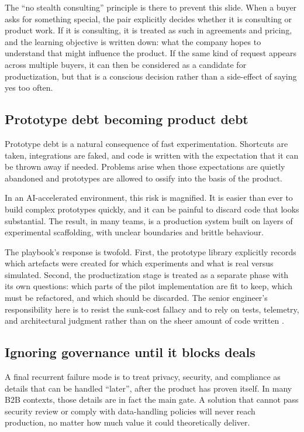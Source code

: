 \documentclass[10pt, a4paper, twocolumn]{article} %
\begin{document}
The “no stealth consulting” principle is there to prevent this slide. When a buyer asks for something special, the pair explicitly decides whether it is consulting or product work. If it is consulting, it is treated as such in agreements and pricing, and the learning objective is written down: what the company hopes to understand that might influence the product. If the same kind of request appears across multiple buyers, it can then be considered as a candidate for productization, but that is a conscious decision rather than a side-effect of saying yes too often.

\newpage
\subsection{Prototype debt becoming product debt}

Prototype debt is a natural consequence of fast experimentation. Shortcuts are taken, integrations are faked, and code is written with the expectation that it can be thrown away if needed. Problems arise when those expectations are quietly abandoned and prototypes are allowed to ossify into the basis of the product.

In an AI-accelerated environment, this risk is magnified. It is easier than ever to build complex prototypes quickly, and it can be painful to discard code that looks substantial. The result, in many teams, is a production system built on layers of experimental scaffolding, with unclear boundaries and brittle behaviour.

The playbook’s response is twofold. First, the prototype library explicitly records which artefacts were created for which experiments and what is real versus simulated. Second, the productization stage is treated as a separate phase with its own questions: which parts of the pilot implementation are fit to keep, which must be refactored, and which should be discarded. The senior engineer’s responsibility here is to resist the sunk-cost fallacy and to rely on tests, telemetry, and architectural judgment rather than on the sheer amount of code written \citep{forsgren2018accelerate,blomgren2025coordination}.

\newpage
\subsection{Ignoring governance until it blocks deals}

A final recurrent failure mode is to treat privacy, security, and compliance as details that can be handled “later”, after the product has proven itself. In many B2B contexts, those details are in fact the main gate. A solution that cannot pass security review or comply with data-handling policies will never reach production, no matter how much value it could theoretically deliver.
\end{document}
